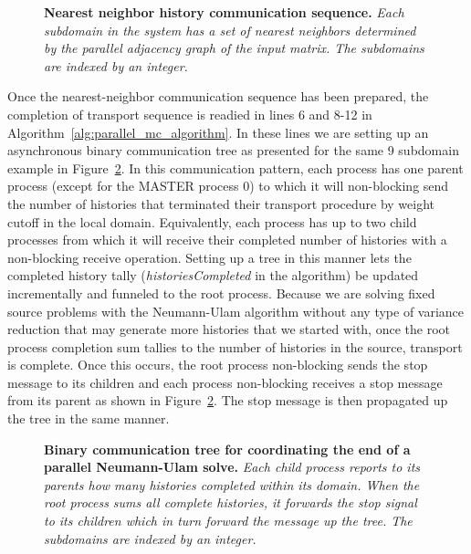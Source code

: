 \documentclass[letterpaper,11pt]{article}
\begin{document}
\begin{figure}[t!]
  \begin{center}
    \scalebox{1.25}{  }
  \end{center}
  \caption{\textbf{Nearest neighbor history communication sequence.}
    \textit{Each subdomain in the system has a set of nearest
      neighbors determined by the parallel adjacency graph of the
      input matrix. The subdomains are indexed by an integer.}}
  \label{fig:nearest_neighbor_comm}
\end{figure}

Once the nearest-neighbor communication sequence has been prepared,
the completion of transport sequence is readied in lines 6 and 8-12 in
Algorithm~\ref{alg:parallel_mc_algorithm}. In these lines we are
setting up an asynchronous binary communication tree as presented for
the same 9 subdomain example in Figure~\ref{fig:binary_comm_tree}. In
this communication pattern, each process has one parent process
(except for the MASTER process 0) to which it will non-blocking send
the number of histories that terminated their transport procedure by
weight cutoff in the local domain. Equivalently, each process has up
to two child processes from which it will receive their completed
number of histories with a non-blocking receive operation. Setting up a
tree in this manner lets the completed history tally
(\textit{historiesCompleted} in the algorithm) be updated
incrementally and funneled to the root process. Because we are solving
fixed source problems with the Neumann-Ulam algorithm without any type
of variance reduction that may generate more histories that we started
with, once the root process completion sum tallies to the number of
histories in the source, transport is complete. Once this occurs, the
root process non-blocking sends the stop message to its children and
each process non-blocking receives a stop message from its parent as
shown in Figure~\ref{fig:binary_comm_tree}. The stop message is then
propagated up the tree in the same manner.

\begin{figure}[t!]
  \begin{center}
    \scalebox{1.0}{
       }
  \end{center}
  \caption{\textbf{Binary communication tree for coordinating the end
      of a parallel Neumann-Ulam solve.} \textit{Each child process
      reports to its parents how many histories completed within its
      domain. When the root process sums all complete histories, it
      forwards the stop signal to its children which in turn forward
      the message up the tree. The subdomains are indexed by an
      integer.}}
  \label{fig:binary_comm_tree}
\end{figure}
\end{document}
